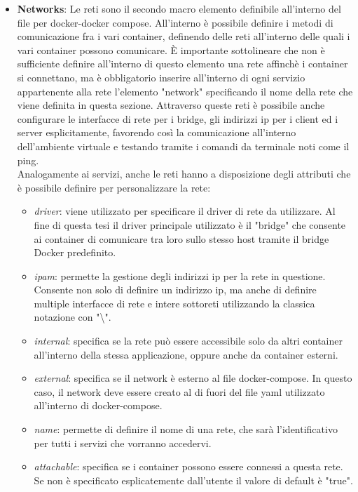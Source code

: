 \begin{itemize}
\item \textbf{Networks}: Le reti sono il secondo macro elemento definibile all'interno del file per docker-docker compose. All'interno è possibile definire i metodi di comunicazione fra i vari container, definendo delle reti all'interno delle quali i vari container possono comunicare. È importante sottolineare che 
    non è sufficiente definire all'interno di questo elemento una rete affinchè i container si connettano, ma è obbligatorio inserire all'interno di ogni servizio appartenente alla rete l'elemento "network" specificando il nome della rete che viene definita in questa sezione. Attraverso queste reti è possibile anche 
    configurare le interfacce di rete per i bridge, gli indirizzi ip per i client ed i server esplicitamente, favorendo così la comunicazione all'interno dell'ambiente virtuale e testando tramite i comandi da terminale noti come il ping. \\
    Analogamente ai servizi, anche le reti hanno a disposizione degli attributi che è possibile definire per personalizzare la rete:

    \begin{itemize}
        \item \textit{driver}: viene utilizzato per specificare il driver di rete da utilizzare. Al fine di questa tesi il driver principale utilizzato è il "bridge" che consente ai container di comunicare tra loro sullo stesso host tramite il bridge Docker predefinito.
        \item \textit{ipam}:  permette la gestione degli indirizzi ip per la rete in questione. Consente non solo di definire un indirizzo ip, ma anche di definire multiple interfacce di rete e intere sottoreti utilizzando la classica notazione con "\textbackslash".
        \item \textit{internal}: specifica se la rete può essere accessibile solo da altri container all'interno della stessa applicazione, oppure anche da container esterni.
        \item \textit{external}: specifica se il network è esterno al file docker-compose. In questo caso, il network deve essere creato al di fuori del file yaml utilizzato all'interno di docker-compose.
        \item \textit{name}: permette di definire il nome di una rete, che sarà l'identificativo per tutti i servizi che vorranno accedervi.
        \item \textit{attachable}: specifica se i container possono essere connessi a questa rete. Se non è specificato esplicatemente dall'utente il valore di default è "true".
        
    \end{itemize}
\end{itemize}


